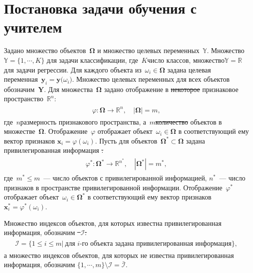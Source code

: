 \documentclass[12pt]{a&t}
\providecommand{\DIFadd}[1]{{\protect\color{blue}\uwave{#1}}} %
\providecommand{\DIFdel}[1]{{\protect\color{red}\sout{#1}}}                      %
\providecommand{\DIFaddbegin}{} %
\providecommand{\DIFaddend}{} %
\providecommand{\DIFdelbegin}{} %
\providecommand{\DIFdelend}{} %
\newcommand{\DIFscaledelfig}{0.5}
\newlength{\DIFdelgraphicswidth} %
\newlength{\DIFdelgraphicsheight} %
\newcommand{\DIFaddincludegraphics}[2][]{{\color{blue}\fbox{\DIFOincludegraphics[#1]{#2}}}} %
\newcommand{\DIFdelincludegraphics}[2][]{%
\sbox{\DIFdelgraphicsbox}{\DIFOincludegraphics[#1]{#2}}%
\settoboxwidth{\DIFdelgraphicswidth}{\DIFdelgraphicsbox} %
\settoboxtotalheight{\DIFdelgraphicsheight}{\DIFdelgraphicsbox} %
\scalebox{\DIFscaledelfig}{%
\parbox[b]{\DIFdelgraphicswidth}{\usebox{\DIFdelgraphicsbox}\\[-\baselineskip] \rule{\DIFdelgraphicswidth}{0em}}\llap{\resizebox{\DIFdelgraphicswidth}{\DIFdelgraphicsheight}{%
\setlength{\unitlength}{\DIFdelgraphicswidth}%
\begin{picture}(1,1)%
\thicklines\linethickness{2pt} %
{\color[rgb]{1,0,0}\put(0,0){\framebox(1,1){}}}%
{\color[rgb]{1,0,0}\put(0,0){\line( 1,1){1}}}%
{\color[rgb]{1,0,0}\put(0,1){\line(1,-1){1}}}%
\end{picture}%
}\hspace*{3pt}}} %
} %
\DeclareRobustCommand{\DIFaddbegin}{\DIFOaddbegin \let\includegraphics\DIFaddincludegraphics} %
\DeclareRobustCommand{\DIFaddend}{\DIFOaddend \let\includegraphics\DIFOincludegraphics} %
\DeclareRobustCommand{\DIFdelbegin}{\DIFOdelbegin \let\includegraphics\DIFdelincludegraphics} %
\DeclareRobustCommand{\DIFdelend}{\DIFOaddend \let\includegraphics\DIFOincludegraphics} %
\begin{document}
\section{Постановка задачи обучения с учителем}
Задано множество объектов~$\bm{\Omega}$ и множество целевых переменных~$\mathbb{Y}$. Множество~$\mathbb{Y}=\{1,\cdots,K\}$ для задачи классификации, где~$K$\DIFaddbegin \DIFadd{~--- }\DIFaddend число классов, множество\DIFaddbegin \DIFadd{~}\DIFaddend $\mathbb{Y}=\mathbb{R}$ для задачи регрессии.
Для каждого объекта из~$\omega_i \in \bm{\Omega}$ задана целевая переменная~$\mathbf{y}_i = \mathbf{y}\bigr(\omega_i\bigr)$. Множество целевых переменных для всех объектов обозначим~$\mathbf{Y}$.
Для множества~$\bm{\Omega}$ задано отображение в \DIFdelbegin \DIFdel{некоторое }\DIFdelend признаковое пространство~$\mathbb{R}^{n}$:
\begin{gather}
\label{eq:st:phi}
\begin{aligned}
\varphi:\bm{\Omega} \to \mathbb{R}^{n}, \quad \left|\bm{\Omega}\right| = m,
\end{aligned}
\end{gather}
где~$n$\DIFaddbegin \DIFadd{~--- }\DIFaddend размерность признакового пространства, а~$m$\DIFdelbegin \DIFdel{количество }\DIFdelend \DIFaddbegin \DIFadd{~--- число }\DIFaddend объектов в множестве~$\bm{\Omega}$. Отображение~$\varphi$ отображает объект~$\omega_i \in \bm{\Omega}$ в соответствующий ему вектор признаков $\mathbf{x}_i = \varphi(\omega_i)$.
Пусть для объектов~$\bm{\Omega}^* \subset \bm{\Omega}$ задана привилегированная информация
\DIFdelbegin \DIFdel{:
}\DIFdelend \begin{gather}
\label{eq:st:phi*}
\begin{aligned}
\varphi^*:\bm{\Omega}^* \to \mathbb{R}^{n^*}, \quad \left|\bm{\Omega}^*\right| = m^*,
\end{aligned}
\end{gather}
где~$m^* \leq m$~--- число объектов с привилегированной информацией, $n^*$~--- число признаков в пространстве привилегированной информации. Отображение~$\varphi^*$ отображает объект~$\omega_i \in \bm{\Omega^*}$ в соответствующий ему вектор признаков $\mathbf{x}^*_i = \varphi^*(\omega_i)$.

Множество индексов объектов, для которых известна привилегированная информация, обозначим
\DIFdelbegin \DIFdel{~$\mathcal{I}$:
}\DIFdelend \begin{gather}
\label{eq:st:3}
\begin{aligned}
\mathcal{I} = \{1 \leq i \leq m |~\text{для $i$-го объекта задана привилегированная информация}\},
\end{aligned}
\end{gather}
а множество индексов объектов, для которых не известна привилегированная информация, обозначим \DIFdelbegin \DIFdel{$\{1, \cdots, m\}\setminus \mathcal{I} = \bar{\mathcal{I}}$}\DIFdelend \DIFaddbegin \DIFadd{$\bar{\mathcal{I}}=\{1, \cdots, m\}\setminus \mathcal{I}$}\DIFaddend .
\end{document}
